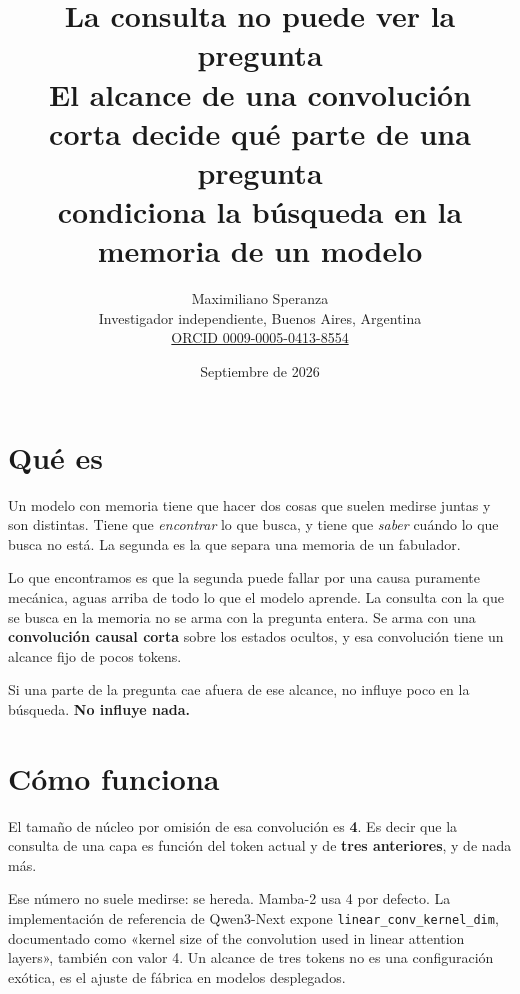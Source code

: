 \documentclass[11pt,a4paper]{article}
\title{\bfseries La consulta no puede ver la pregunta\\[0.3em]
\large El alcance de una convolución corta decide qué parte de una pregunta\\
condiciona la búsqueda en la memoria de un modelo}
\author{Maximiliano Speranza\\
\small Investigador independiente, Buenos Aires, Argentina\\
\small \href{https://orcid.org/0009-0005-0413-8554}{ORCID 0009-0005-0413-8554}}
\date{Septiembre de 2026}
\begin{document}
\maketitle

\begin{center}
\end{center}

\section{Qué es}

Un modelo con memoria tiene que hacer dos cosas que suelen medirse juntas y son distintas. Tiene que
\emph{encontrar} lo que busca, y tiene que \emph{saber} cuándo lo que busca no está. La segunda es la
que separa una memoria de un fabulador.

Lo que encontramos es que la segunda puede fallar por una causa puramente mecánica, aguas arriba de
todo lo que el modelo aprende. La consulta con la que se busca en la memoria no se arma con la
pregunta entera. Se arma con una \textbf{convolución causal corta} sobre los estados ocultos, y esa
convolución tiene un alcance fijo de pocos tokens.

Si una parte de la pregunta cae afuera de ese alcance, no influye poco en la búsqueda.
\textbf{No influye nada.}

\section{Cómo funciona}

El tamaño de núcleo por omisión de esa convolución es \textbf{4}. Es decir que la consulta de una capa
es función del token actual y de \textbf{tres anteriores}, y de nada más.

Ese número no suele medirse: se hereda. Mamba-2 usa 4 por defecto. La implementación de referencia de
Qwen3-Next expone \texttt{linear\_conv\_kernel\_dim}, documentado como «kernel size of the convolution
used in linear attention layers», también con valor 4. Un alcance de tres tokens no es una
configuración exótica, es el ajuste de fábrica en modelos desplegados.
\end{document}
